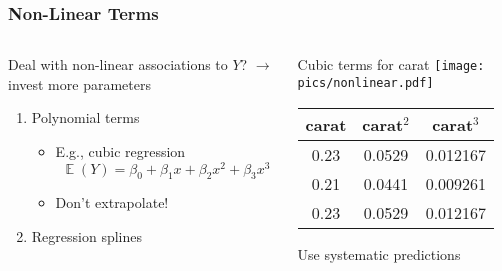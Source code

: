 \documentclass[
    utf8,
    aspectratio=169
]{beamer}  %
\DeclareMathOperator{\E}{\mathbb{E}}  %
\begin{document}
\begin{frame}
	\frametitle{Non-Linear Terms}
	\begin{columns}
		\begin{block}{Deal with non-linear associations to $Y$?} $\rightarrow$ invest more parameters
		\begin{enumerate}
			\item Polynomial terms
			\begin{itemize}
				\item E.g., cubic regression
				$$
					\E(Y) = \beta_0 + \beta_1 x + \beta_2 x^2 + \beta_3 x^3
				$$
				\item Don't extrapolate!
			\end{itemize}
			\item Regression splines
		\end{enumerate}
		\end{block}
		
		\begin{block}{\centering Cubic terms for carat}
			\texttt{[image: pics/nonlinear.pdf]}
			\vspace{-9em}
			\begin{scriptsize}
				\begin{table}
					\raggedleft
					\begin{tabular}{ccc}
						carat & carat$^2$ & carat$^3$ \\
								\hline
						 0.23       &            0.0529       &          0.012167\\
						 0.21       &            0.0441       &          0.009261\\
						 0.23       &            0.0529       &          0.012167\\
					\hline
					\end{tabular}
				\end{table}
			\end{scriptsize}
			\vspace{3em}
			\centering Use systematic predictions
		\end{block}
	\end{columns}
\end{frame}
\end{document}
